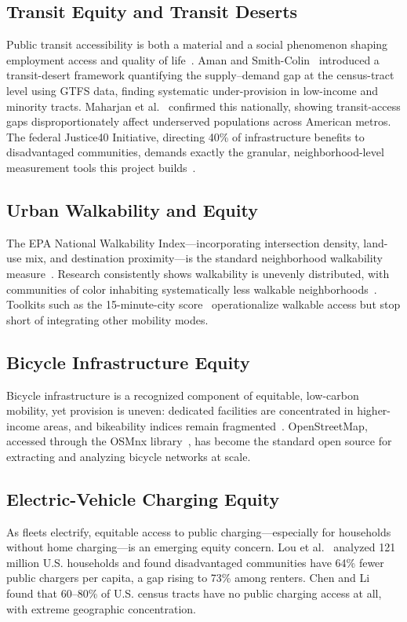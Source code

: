 \documentclass[11pt]{article}
\begin{document}
\subsection{Transit Equity and Transit Deserts}
Public transit accessibility is both a material and a social phenomenon shaping
employment access and quality of life~\cite{ermagun2020}. Aman and
Smith-Colin~\cite{aman2020} introduced a transit-desert framework quantifying the
supply--demand gap at the census-tract level using GTFS data, finding systematic
under-provision in low-income and minority tracts. Maharjan et al.~\cite{maharjan2024}
confirmed this nationally, showing transit-access gaps disproportionately affect
underserved populations across American metros. The federal Justice40 Initiative,
directing 40\% of infrastructure benefits to disadvantaged communities, demands
exactly the granular, neighborhood-level measurement tools this project
builds~\cite{argonne2022}.

\subsection{Urban Walkability and Equity}
The EPA National Walkability Index---incorporating intersection density,
land-use mix, and destination proximity---is the standard neighborhood
walkability measure~\cite{epa2024}. Research consistently shows walkability is
unevenly distributed, with communities of color inhabiting systematically less
walkable neighborhoods~\cite{urban2022}. Toolkits such as the 15-minute-city
score~\cite{albashir2024} operationalize walkable access but stop short of
integrating other mobility modes.

\subsection{Bicycle Infrastructure Equity}
Bicycle infrastructure is a recognized component of equitable, low-carbon
mobility, yet provision is uneven: dedicated facilities are concentrated in
higher-income areas, and bikeability indices remain
fragmented~\cite{ahmed2024,sustrans2023}. OpenStreetMap, accessed through the
OSMnx library~\cite{boeing2017}, has become the standard open source for
extracting and analyzing bicycle networks at scale.

\subsection{Electric-Vehicle Charging Equity}
As fleets electrify, equitable access to public charging---especially for
households without home charging---is an emerging equity concern. Lou et
al.~\cite{lou2025} analyzed 121 million U.S. households and found disadvantaged
communities have 64\% fewer public chargers per capita, a gap rising to 73\%
among renters. Chen and Li~\cite{chenli2024} found that 60--80\% of U.S. census
tracts have no public charging access at all, with extreme geographic
concentration.
\end{document}
